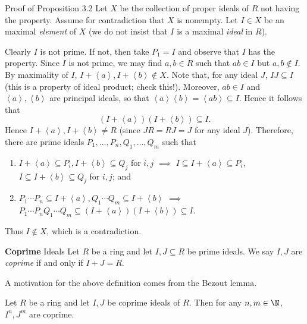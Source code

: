\documentclass[pmath441]{subfiles}
\begin{document}
    \begin{boxyproof}{Proof of Proposition 3.2}
        Let $X$ be the collection of proper ideals of $R$ not having the property. Assume for contradiction that $X$ is nonempty. Let $I\in X$ be an maximal \textit{element} of $X$ (we do not insist that $I$ is a maximal \textit{ideal} in $R$).

        Clearly $I$ is not prime. If not, then take $P_1=I$ and observe that $I$ has the property. Since $I$ is not prime, we may find $a,b\in R$ such that $ab\in I$ but $a,b\notin I$. By maximality of $I$, $I+\left< a \right>,I+\left< b \right>\notin X$. Note that, for any ideal $J$, $IJ\subseteq I$ (this is a property of ideal product; check this!). Moreover, $ab\in I$ and $\left< a \right>,\left< b \right>$ are principal ideals, so that $\left< a \right>\left< b \right> = \left< ab \right> \subseteq I$. Hence it follows that     
        \begin{equation*}
            \left( I+\left< a \right>  \right)\left( I+\left< b \right>  \right) \subseteq I.
        \end{equation*}
        Hence $I+\left< a \right>, I+\left< b \right>\neq R$ (since $JR=RJ=J$ for any ideal $J$). Therefore, there are prime ideals $P_1,\ldots,P_n,Q_1,\ldots,Q_m$ such that
        \begin{enumerate}
            \item $I+\left< a \right>\subseteq P_i, I+\left< b \right>\subseteq Q_j$ for $i,j$ $\implies$ $I\subseteq I+\left< a \right>\subseteq P_i$, $I\subseteq I+\left< b \right>\subseteq Q_j$ for $i,j$; and
            \item $P_1\cdots P_n\subseteq I+\left< a \right>, Q_1\cdots Q_m\subseteq I+\left< b \right>$ $\implies$ $P_1\cdots P_nQ_1\cdots Q_m\subseteq\left( I+\left< a \right>  \right)\left( I+\left< b \right>  \right)\subseteq I$.
        \end{enumerate}
        Thus $I\notin X$, which is a contradiction.
    \end{boxyproof}
    
    \begin{definition}{\textbf{Coprime} Ideals}
        Let $R$ be a ring and let $I,J\subseteq R$ be prime ideals. We say $I,J$ are \emph{coprime} if and only if $I+J=R$.
    \end{definition}

    \np A motivation for the above definition comes from the Bezout lemma.

    \begin{prop}{}
        Let $R$ be a ring and let $I,J$ be coprime ideals of $R$. Then for any $n,m\in\N$, $I^n,J^m$ are coprime.
    \end{prop}
\end{document}
